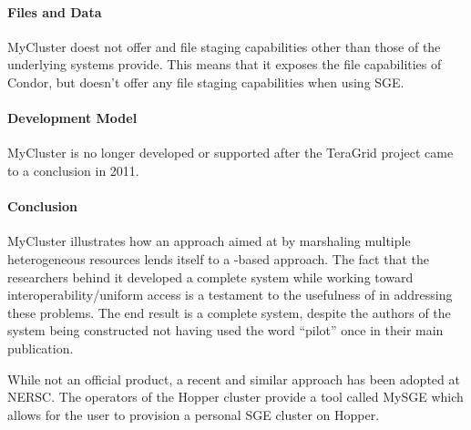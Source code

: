 \documentclass{sig-alternate}
\begin{document}
\paragraph{Files and Data}

MyCluster doest not offer and file staging capabilities other than those of the
underlying systems provide. This means that it exposes the file capabilities of
Condor, but doesn't offer any file staging capabilities when using SGE.

\paragraph{Development Model}

MyCluster is no longer developed or supported after the TeraGrid project came
to a conclusion in 2011. 

\paragraph{Conclusion}

MyCluster illustrates how an approach aimed at 
by marshaling multiple heterogeneous resources lends itself to a \pilot-based approach. The fact that the researchers behind
it developed a complete \pilot system while working toward
interoperability/uniform access is a testament to the usefulness of \pilots in
addressing these problems. The end result is a complete \pilot system, despite
the authors of the system being constructed not having used the word ``pilot'' once in their main publication.

While not an official product, a recent and similar approach has been adopted
at NERSC. The operators of the Hopper cluster provide a tool called MySGE which
allows for the user to provision a personal SGE cluster on Hopper.

%
%
\subsubsection{\panda}
\label{sec:panda}
\end{document}
